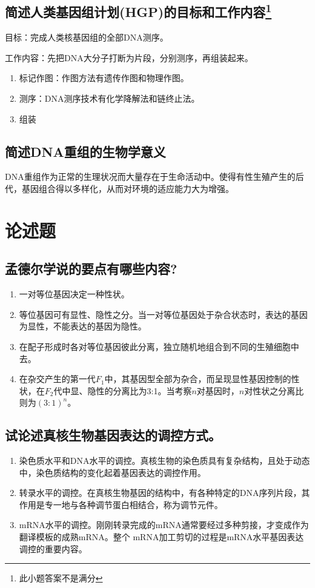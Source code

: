 \documentclass[UTF8]{article}
\begin{document}
    \subsection{简述人类基因组计划(HGP)的目标和工作内容\protect\footnote{此小题答案不是满分}}
    目标：完成人类核基因组的全部DNA测序。

    工作内容：先把DNA大分子打断为片段，分别测序，再组装起来。
    \begin{enumerate}
        \item 标记作图：作图方法有遗传作图和物理作图。
        \item 测序：DNA测序技术有化学降解法和链终止法。
        \item 组装
    \end{enumerate}
    \subsection{简述DNA重组的生物学意义}
    DNA重组作为正常的生理状况而大量存在于生命活动中。使得有性生殖产生的后代，基因组合得以多样化，从而对环境的适应能力大为增强。
    \section{论述题}
    \subsection{孟德尔学说的要点有哪些内容?}
    \begin{enumerate}
        \item 一对等位基因决定一种性状。
        \item 等位基因可有显性、隐性之分。当一对等位基因处于杂合状态时，表达的基因为显性，不能表达的基因为隐性。
        \item 在配子形成时各对等位基因彼此分离，独立随机地组合到不同的生殖细胞中去。
        \item 在杂交产生的第一代$F_1$中，其基因型全部为杂合，而呈现显性基因控制的性状，在$F_2$代中显、隐性的分离比为3:1。当考察$n$对基因时，$n$对性状之分离比则为$(3:1)^n$。
    \end{enumerate}
    \subsection{试论述真核生物基因表达的调控方式。}
    \begin{enumerate}
        \item 染色质水平和DNA水平的调控。真核生物的染色质具有复杂结构，且处于动态中，染色质结构的变化起着基因表达的调控作用。
        \item 转录水平的调控。在真核生物基因的结构中，有各种特定的DNA序列片段，其作用是专一地与各种调节蛋白相结合，称为调节元件。
        \item mRNA水平的调控。刚刚转录完成的mRNA通常要经过多种剪接，才变成作为翻译模板的成熟mRNA。整个 mRNA加工剪切的过程是mRNA水平基因表达调控的重要内容。
    \end{enumerate}
\end{document}
